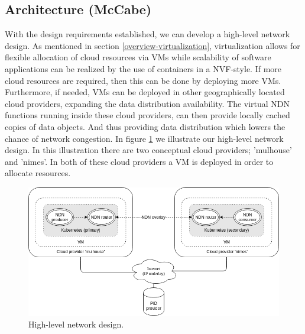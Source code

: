 \subsection{Architecture (McCabe)}
\label{planning-architecture}
With the design requirements established, we can develop a high-level network design. As mentioned in section \ref{overview-virtualization}, virtualization allows for flexible allocation of cloud resources via VMs while scalability of software applications can be realized by the use of containers in a NVF-style. If more cloud resources are required, then this can be done by deploying more VMs. Furthermore, if needed, VMs can be deployed in other geographically located cloud providers, expanding the data distribution availability. The virtual NDN functions running inside these cloud providers, can then provide locally cached copies of data objects. And thus providing data distribution which lowers the chance of network congestion. In figure \ref{fig:high-level-network-design} we illustrate our high-level network design. In this illustration there are two conceptual cloud providers; 'mulhouse' and 'nimes'. In both of these cloud providers a VM is deployed in order to allocate resources.

\begin{figure}[H]
\centering
\includegraphics[width=\columnwidth]{Images/high-level-network-design.png}
\caption{High-level network design.}
\label{fig:high-level-network-design}
\end{figure}


